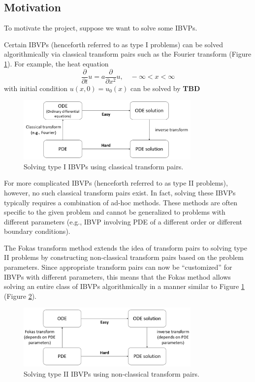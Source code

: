\documentclass[11pt, oneside, a4paper]{article}
\begin{document}
\subsection{Motivation}
To motivate the project, suppose we want to solve some IBVPs.

Certain IBVPs (henceforth referred to as type I problems) can be solved algorithmically via classical transform pairs such as the Fourier transform (Figure \ref{fig:classical_transform}). For example, the heat equation
\[\frac{\partial}{\partial t}u = a\frac{\partial}{\partial x^2}u,\quad -\infty<x<\infty\]
with initial condition $u(x,0) = u_0(x)$ can be solved by \textbf{TBD}
\begin{figure}[htpb!]
    \centering
    \includegraphics[width=0.8\textwidth]{classical_transform.png}
    \caption{Solving type I IBVPs using classical transform pairs.}
    \label{fig:classical_transform}
\end{figure}

For more complicated IBVPs (henceforth referred to as type II problems), however, no such classical transform pairs exist. In fact, solving these IBVPs typically requires a combination of ad-hoc methods. These methods are often specific to the given problem and cannot be generalized to problems with different parameters (e.g., IBVP involving PDE of a different order or different boundary conditions).

The Fokas transform method \cite{Fokas2008} extends the idea of transform pairs to solving type II problems by constructing non-classical transform pairs based on the problem parameters. Since appropriate transform pairs can now be ``customized'' for IBVPs with different parameters, this means that the Fokas method allows solving an entire class of IBVPs algorithmically in a manner similar to Figure \ref{fig:classical_transform} (Figure \ref{fig:non-classical_transform}).
\begin{figure}[htpb!]
    \centering
    \includegraphics[width=0.8\textwidth]{non-classical_transform.png}
    \caption{Solving type II IBVPs using non-classical transform pairs.}
    \label{fig:non-classical_transform}
\end{figure}
\end{document}
